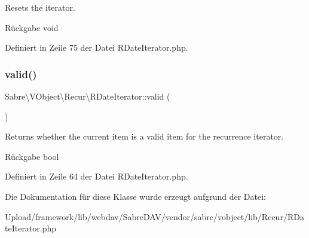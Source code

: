 Resets the iterator.

\begin{DoxyReturn}{Rückgabe}
void 
\end{DoxyReturn}


Definiert in Zeile 75 der Datei R\+Date\+Iterator.\+php.

\mbox{\label{class_sabre_1_1_v_object_1_1_recur_1_1_r_date_iterator_aa7faa7b88f6fafb55c84755ee51dcf91}} 
\subsubsection{\texorpdfstring{valid()}{valid()}}
{\footnotesize\ttfamily Sabre\textbackslash{}\+V\+Object\textbackslash{}\+Recur\textbackslash{}\+R\+Date\+Iterator\+::valid (\begin{DoxyParamCaption}{ }\end{DoxyParamCaption})}

Returns whether the current item is a valid item for the recurrence iterator.

\begin{DoxyReturn}{Rückgabe}
bool 
\end{DoxyReturn}


Definiert in Zeile 64 der Datei R\+Date\+Iterator.\+php.



Die Dokumentation für diese Klasse wurde erzeugt aufgrund der Datei\+:\begin{DoxyCompactItemize}
\item 
Upload/framework/lib/webdav/\+Sabre\+D\+A\+V/vendor/sabre/vobject/lib/\+Recur/R\+Date\+Iterator.\+php\end{DoxyCompactItemize}
